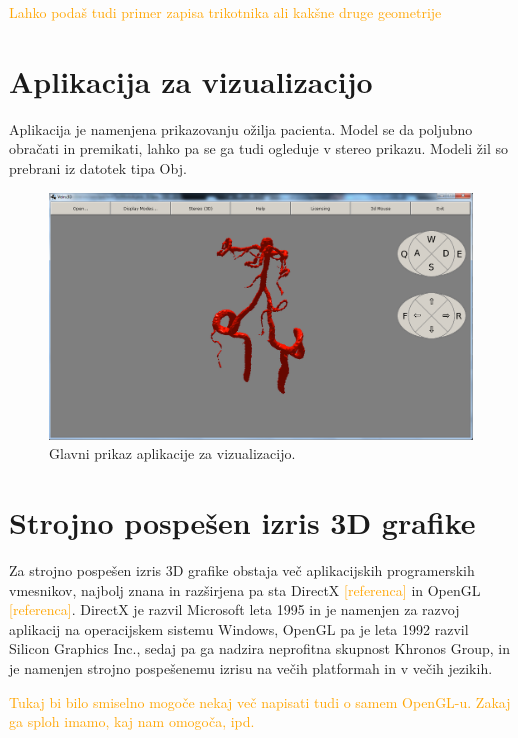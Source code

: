 \documentclass[a4paper, 12pt]{book}
\begin{document}
\textcolor{orange}{Lahko podaš tudi primer zapisa trikotnika ali kakšne druge geometrije}

\section{Aplikacija za vizualizacijo}

Aplikacija je namenjena prikazovanju ožilja pacienta. Model se da poljubno obračati in premikati, lahko pa se ga tudi ogleduje v stereo prikazu. Modeli žil so prebrani iz datotek tipa Obj. 

\begin{figure}
\begin{center}
\includegraphics[width=14cm]{aplikacija.png}
\end{center}
\caption{Glavni prikaz aplikacije za vizualizacijo.}
\label{aplikacija}
\end{figure}

\section{Strojno pospešen izris 3D grafike}
Za strojno pospešen izris 3D grafike obstaja več aplikacijskih programerskih vmesnikov, najbolj znana in razširjena pa sta DirectX \textcolor{orange}{[referenca]} in OpenGL  \textcolor{orange}{[referenca]}. DirectX je razvil Microsoft leta 1995 in je namenjen za razvoj aplikacij na operacijskem sistemu Windows, OpenGL pa je leta 1992 razvil Silicon Graphics Inc., sedaj pa ga nadzira neprofitna skupnost Khronos Group, in je namenjen strojno pospešenemu izrisu na večih platformah in v večih jezikih. 

\textcolor{orange}{Tukaj bi bilo smiselno mogoče nekaj več napisati tudi o samem OpenGL-u. Zakaj ga sploh imamo, kaj nam omogoča, ipd.}
\end{document}
